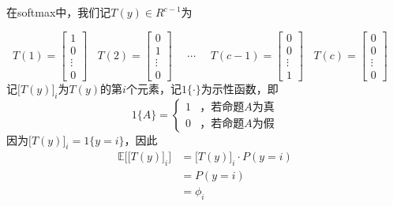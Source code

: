 在softmax中，我们记$T(y) \in R^{c-1}$为

\begin{equation}
T(1) = \left[               %
\begin{array}{cccc}  
1\\  
0\\
\vdots\\
0
\end{array}
\right]~~~~%
T(2) = \left[   
\begin{array}{cccc}  
0\\  
1\\
\vdots\\
0
\end{array}
\right]~~~~~~%
\cdots~~~~~~
T(c-1) = \left[   
\begin{array}{cccc}  
0\\  
0\\
\vdots\\
1
\end{array}
\right]~~~~%
T(c) = \left[   
\begin{array}{cccc}  
0\\  
0\\
\vdots\\
0
\end{array}
\right]~~~~%
\end{equation}
记$\Big[T(y)\Big]_i$为$T(y)$的第$i$个元素，记$1 \{\cdot\}$为示性函数，即
\begin{equation}
1 \{A\} = \left\{
\begin{array}{cc}
1 & \text{，若命题$A$为真} \\
0 & \text{，若命题$A$为假}
\end{array}
\right.
\end{equation}
因为$\Big[T(y)\Big]_i = 1\{y = i\}$，因此
\begin{equation}
\begin{split}
\mathbb{E}\bigg[\big[T(y)\big]_i\bigg] &= \big[T(y)\big]_i \cdot P(y = i) \\
&= P(y=i)  \\
&= \phi_i
\end{split}
\end{equation}

